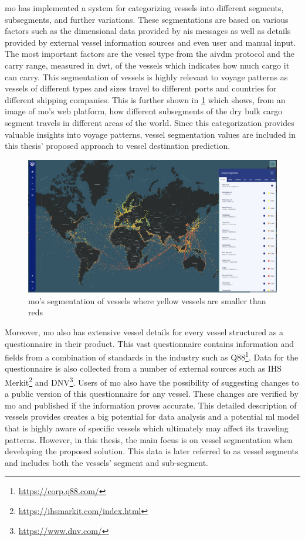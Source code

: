 \acrshort{mo} has implemented a system for categorizing vessels into different segments, subsegments, and further variations. These segmentations are based on various factors such as the dimensional data provided by \acrshort{ais} messages as well as details provided by external vessel information sources and even user and manual input. The most important factors are the vessel type from the \gls{aivdm} protocol and the carry range, measured in \acrshort{dwt}, of the vessels which indicates how much cargo it can carry. This segmentation of vessels is highly relevant to voyage patterns as vessels of different types and sizes travel to different ports and countries for different shipping companies. This is further shown in \cref{fig:segment_map} which shows, from an image of \acrshort{mo}'s web platform, how different subsegments of the dry bulk cargo segment travels in different areas of the world. Since this categorization provides valuable insights into voyage patterns, vessel segmentation values are included in this thesis' proposed approach to vessel destination prediction.

\begin{figure}[htbp]  %
    \centering
    \includegraphics[width=1.0\textwidth]{figures/segment_map}
    \caption{\acrfull{mo}’s segmentation of vessels where yellow vessels are smaller than reds}
    \label{fig:segment_map}
\end{figure}

Moreover, \acrshort{mo} also has extensive vessel details for every vessel structured as a questionnaire in their product. This vast questionnaire contains information and fields from a combination of standards in the industry such as Q88\footnote{\url{https://corp.q88.com/}}. Data for the questionnaire is also collected from a number of external sources such as IHS Merkit\footnote{\url{https://ihsmarkit.com/index.html}} and DNV\footnote{\url{https://www.dnv.com/}}. Users of \acrshort{mo} also have the possibility of suggesting changes to a public version of this questionnaire for any vessel. These changes are verified by \acrshort{mo} and published if the information proves accurate. This detailed description of vessels provides creates a big potential for data analysis and a potential \acrshort{ml} model that is highly aware of specific vessels which ultimately may affect its traveling patterns. However, in this thesis, the main focus is on vessel segmentation when developing the proposed solution. This data is later referred to as vessel segments and includes both the vessels' segment and sub-segment.


